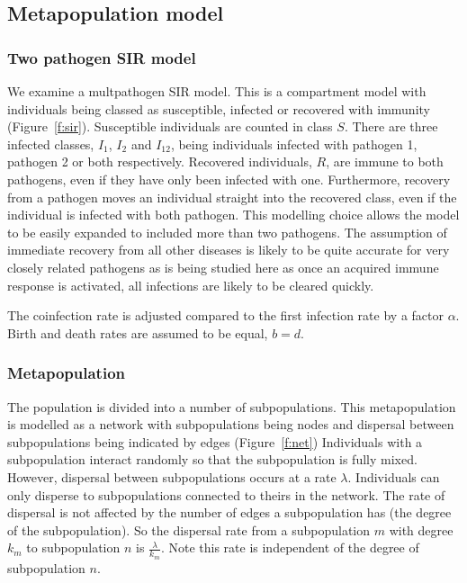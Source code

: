 



\subsection{Metapopulation model}




\subsubsection{Two pathogen SIR model}

We examine a multpathogen SIR model. 
This is a compartment model with individuals being classed as susceptible, infected or recovered with immunity (Figure~\ref{f:sir}).
Susceptible individuals are counted in class $S$.
There are three infected classes, $I_1$, $I_2$ and $I_{12}$, being individuals infected with pathogen 1, pathogen 2 or both respectively.
Recovered individuals, $R$, are immune to both pathogens, even if they have only been infected with one.
Furthermore, recovery from a pathogen moves an individual straight into the recovered class, even if the individual is infected with both pathogen.
This modelling choice allows the model to be easily expanded to included more than two pathogens.
The assumption of immediate recovery from all other diseases is likely to be quite accurate for very closely related pathogens as is being studied here as once an acquired immune response is activated, all infections are likely to be cleared quickly.

The coinfection rate is adjusted compared to the first infection rate by a factor $\alpha$.
Birth and death rates are assumed to be equal, $b = d$.


\subsubsection{Metapopulation}


The population is divided into a number of subpopulations.
This metapopulation is modelled as a network with subpopulations being nodes and dispersal between subpopulations being indicated by edges (Figure~\ref{f:net})
Individuals with a subpopulation interact randomly so that the subpopulation is fully mixed.
However, dispersal between subpopulations occurs at a rate $\lambda$.
Individuals can only disperse to subpopulations connected to theirs in the network.
The rate of dispersal is not affected by the number of edges a subpopulation has (the degree of the subpopulation).
So the dispersal rate from a subpopulation $m$ with degree $k_m$ to subpopulation $n$ is $\frac{\lambda}{k_m}$.
Note this rate is independent of the degree of subpopulation $n$.





